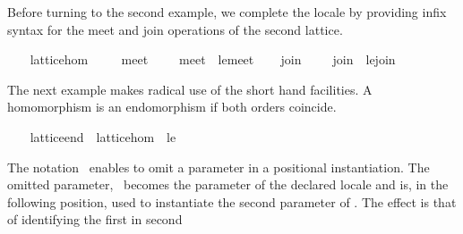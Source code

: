 \begin{isabellebody}
\begin{isamarkuptext}
  Before turning to the second example, we complete the locale by
  providing infix syntax for the meet and join operations of the
  second lattice.%
\end{isamarkuptext}%
\isamarkuptrue%
\ \ \isamarkupfalse%
\ lattice{}hom\ \isanewline
\ \ \isamarkupfalse%
\ meet{}\ {}\ {}{}{}{}{}\ {}{}{}\ \ {}meet{}\ {}\ le{}{}meet{}\isanewline
\ \ \isamarkupfalse%
\ join{}\ {}\ {}{}{}{}{}\ {}{}{}\ \ {}join{}\ {}\ le{}{}join{}\isanewline
\ \ \isamarkupfalse%
%
\begin{isamarkuptext}%
The next example makes radical use of the short hand
  facilities.  A homomorphism is an endomorphism if both orders
  coincide.%
\end{isamarkuptext}%
\isamarkuptrue%
\ \ \isamarkupfalse%
\ lattice{}end\ {}\ lattice{}hom\ {}\ le%
\begin{isamarkuptext}%
The notation~ enables to omit a parameter in a
  positional instantiation.  The omitted parameter,~ becomes
  the parameter of the declared locale and is, in the following
  position, used to instantiate the second parameter of .  The effect is that of identifying the first in second

\end{isamarkuptext}
\end{isabellebody}
